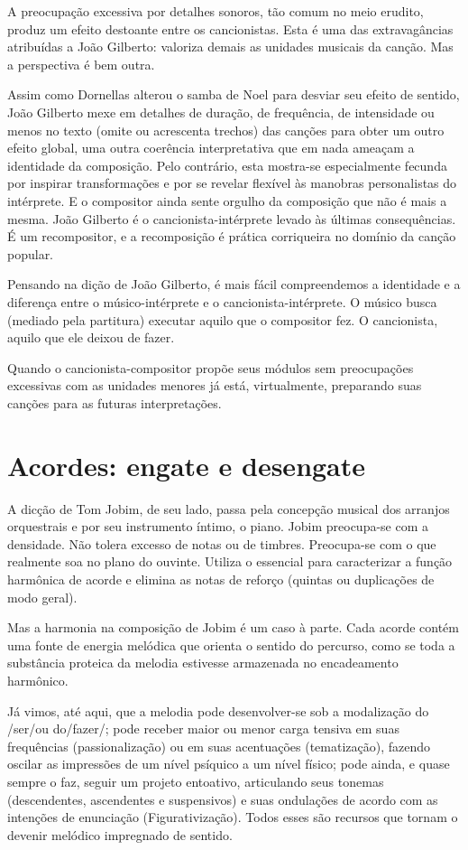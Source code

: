 A preocupação excessiva por detalhes sonoros, tão comum no meio erudito,
produz um efeito destoante entre os cancionistas. Esta é uma das
extravagâncias atribuídas a João Gilberto: valoriza demais as unidades
musicais da canção. Mas a perspectiva é bem outra.

Assim como Dornellas alterou o samba de Noel para desviar seu efeito de
sentido, João Gilberto mexe em detalhes de duração, de frequência, de
intensidade ou menos no texto (omite ou acrescenta trechos) das canções
para obter um outro efeito global, uma outra coerência interpretativa
que em nada ameaçam a identidade da composição. Pelo contrário, esta
mostra-se especialmente fecunda por inspirar transformações e por se
revelar flexível às manobras personalistas do intérprete. E o compositor
ainda sente orgulho da composição que não é mais a mesma. João Gilberto
é o cancionista-intérprete levado às últimas consequências. É um
recompositor, e a recomposição é prática corriqueira no domínio da
canção popular.

Pensando na dição de João Gilberto, é mais fácil compreendemos a
identidade e a diferença entre o músico-intérprete e o
cancionista-intérprete. O músico busca (mediado pela partitura) executar
aquilo que o compositor fez. O cancionista, aquilo que ele deixou de
fazer.

Quando o cancionista-compositor propõe seus módulos sem preocupações
excessivas com as unidades menores já está, virtualmente, preparando
suas canções para as futuras interpretações.

\section{Acordes: engate e desengate}

A dicção de Tom Jobim, de seu lado, passa pela concepção musical dos
arranjos orquestrais e por seu instrumento íntimo, o piano. Jobim
preocupa-se com a densidade. Não tolera excesso de notas ou de timbres.
Preocupa-se com o que realmente soa no plano do ouvinte. Utiliza o
essencial para caracterizar a função harmônica de acorde e elimina as
notas de reforço (quintas ou duplicações de modo geral).

Mas a harmonia na composição de Jobim é um caso à parte. Cada acorde
contém uma fonte de energia melódica que orienta o sentido do percurso,
como se toda a substância proteica da melodia estivesse armazenada no
encadeamento harmônico.

Já vimos, até aqui, que a melodia pode desenvolver-se sob a modalização
do /ser/ou do/fazer/; pode receber maior ou menor carga tensiva em suas
frequências (passionalização) ou em suas acentuações (tematização),
fazendo oscilar as impressões de um nível psíquico a um nível físico;
pode ainda, e quase sempre o faz, seguir um projeto entoativo,
articulando seus tonemas (descendentes, ascendentes e suspensivos) e
suas ondulações de acordo com as intenções de enunciação
(Figurativização). Todos esses são recursos que tornam o devenir
melódico impregnado de sentido.

